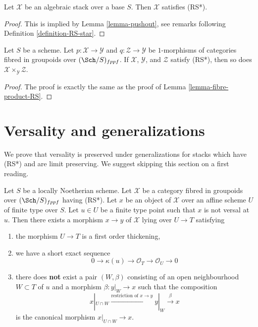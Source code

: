 \begin{lemma}
\label{lemma-algebraic-stack-RS-star}
Let $\mathcal{X}$ be an algebraic stack over a base $S$.
Then $\mathcal{X}$ satisfies (RS*).
\end{lemma}

\begin{proof}
This is implied by Lemma \ref{lemma-pushout}, see
remarks following Definition \ref{definition-RS-star}.
\end{proof}

\begin{lemma}
\label{lemma-fibre-product-RS-star}
Let $S$ be a scheme. Let $p : \mathcal{X} \to \mathcal{Y}$ and
$q : \mathcal{Z} \to \mathcal{Y}$ be $1$-morphisms of categories
fibred in groupoids over $(\Sch/S)_{fppf}$. If $\mathcal{X}$, $\mathcal{Y}$,
and $\mathcal{Z}$ satisfy (RS*), then so
does $\mathcal{X} \times_\mathcal{Y} \mathcal{Z}$.
\end{lemma}

\begin{proof}
The proof is exactly the same as the proof of
Lemma \ref{lemma-fibre-product-RS}.
\end{proof}








\section{Versality and generalizations}
\label{section-generalize-versality}

\noindent
We prove that versality is preserved under generalizations
for stacks which have (RS*) and are limit preserving.
We suggest skipping this section on a first reading.

\begin{lemma}
\label{lemma-single-point}
Let $S$ be a locally Noetherian scheme. Let $\mathcal{X}$ be a category
fibred in groupoids over $(\Sch/S)_{fppf}$ having (RS*).
Let $x$ be an object of $\mathcal{X}$ over an affine scheme $U$
of finite type over $S$. Let $u \in U$ be a finite type point such that
$x$ is not versal at $u$. Then there exists a morphism $x \to y$
of $\mathcal{X}$ lying over $U \to T$ satisfying
\begin{enumerate}
\item the morphism $U \to T$ is a first order thickening,
\item we have a short exact sequence
$$
0 \to \kappa(u) \to \mathcal{O}_T \to \mathcal{O}_U \to 0
$$
\item there does {\bf not} exist a pair $(W, \beta)$
consisting of an open neighbourhood $W \subset T$ of $u$
and a morphism $\beta : y|_W \to x$ such that the composition
$$
x|_{U \cap W} \xrightarrow{\text{restriction of }x \to y}
y|_W \xrightarrow{\beta} x
$$
is the canonical morphism $x|_{U \cap W} \to x$.
\end{enumerate}
\end{lemma}

